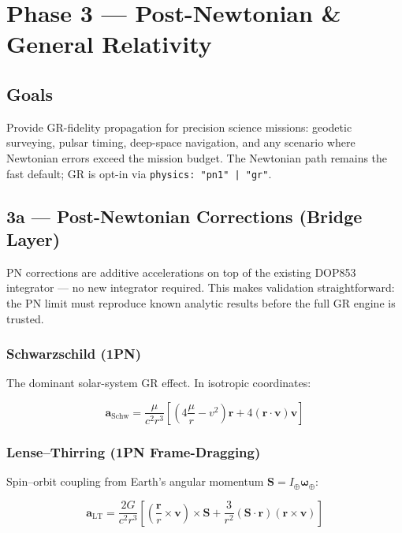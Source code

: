 \documentclass[11pt, a4paper]{article}
\begin{document}
\newpage
\section{Phase 3 — Post-Newtonian \& General Relativity}

\subsection{Goals}

Provide GR-fidelity propagation for precision science missions: geodetic
surveying, pulsar timing, deep-space navigation, and any scenario where
Newtonian errors exceed the mission budget. The Newtonian path remains the
fast default; GR is opt-in via \texttt{physics: "pn1" | "gr"}.

\subsection{3a — Post-Newtonian Corrections (Bridge Layer)}

PN corrections are additive accelerations on top of the existing DOP853
integrator — no new integrator required. This makes validation straightforward:
the PN limit must reproduce known analytic results before the full GR engine
is trusted.

\subsubsection{Schwarzschild (1PN)}

The dominant solar-system GR effect. In isotropic coordinates:

\begin{equation}
  \mathbf{a}_\text{Schw} = \frac{\mu}{c^2 r^3}
  \left[
    \left(4\frac{\mu}{r} - v^2\right)\mathbf{r}
    + 4(\mathbf{r}\cdot\mathbf{v})\mathbf{v}
  \right]
\end{equation}

\subsubsection{Lense--Thirring (1PN Frame-Dragging)}

Spin--orbit coupling from Earth's angular momentum
$\mathbf{S} = I_\oplus \boldsymbol{\omega}_\oplus$:

\begin{equation}
  \mathbf{a}_\text{LT} = \frac{2G}{c^2 r^3}
  \left[
    \left(\frac{\mathbf{r}}{r}\times\mathbf{v}\right)\times\mathbf{S}
    + \frac{3}{r^2}\left(\mathbf{S}\cdot\mathbf{r}\right)
      \left(\mathbf{r}\times\mathbf{v}\right)
  \right]
\end{equation}
\end{document}
